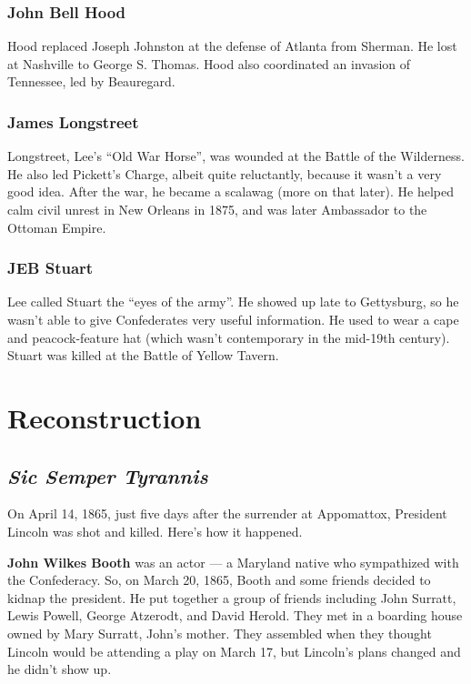 \subsubsection*{John Bell Hood}

Hood replaced Joseph Johnston at the defense of Atlanta from Sherman.
He lost at Nashville to George S. Thomas.
Hood also coordinated an invasion of Tennessee, led by Beauregard.

\subsubsection*{James Longstreet}

Longstreet, Lee's ``Old War Horse'', was wounded at the Battle of the Wilderness.
He also led Pickett's Charge, albeit quite reluctantly, because it wasn't a very good idea.
After the war, he became a scalawag (more on that later).
He helped calm civil unrest in New Orleans in 1875, and was later Ambassador to the Ottoman Empire.

\subsubsection*{JEB Stuart}

Lee called Stuart the ``eyes of the army''.
He showed up late to Gettysburg, so he wasn't able to give Confederates very useful information.
He used to wear a cape and peacock-feature hat (which wasn't contemporary in the mid-19th century).
Stuart was killed at the Battle of Yellow Tavern.

\section{Reconstruction}

\subsection*{\textit{Sic Semper Tyrannis}}

On April 14, 1865, just five days after the surrender at Appomattox, President Lincoln was shot and killed.
Here's how it happened.

\textbf{John Wilkes Booth} was an actor --- a Maryland native who sympathized with the Confederacy.
So, on March 20, 1865, Booth and some friends decided to kidnap the president.
He put together a group of friends including John Surratt, Lewis Powell, George Atzerodt, and David Herold.
They met in a boarding house owned by Mary Surratt, John's mother.
They assembled when they thought Lincoln would be attending a play on March 17,
but Lincoln's plans changed and he didn't show up.

